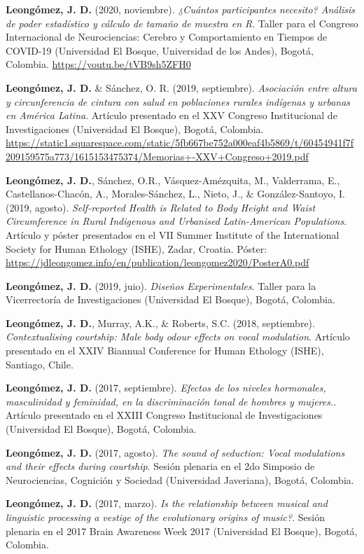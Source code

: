 \documentclass[11pt,a4paper,]{awesome-cv}
\begin{document}
\textbf{Leongómez, J. D.} (2020, noviembre). \emph{¿Cuántos
participantes necesito? Análisis de poder estadístico y cálculo de
tamaño de muestra en R}. Taller para el Congreso Internacional de
Neurociencias: Cerebro y Comportamiento en Tiempos de COVID-19
(Universidad El Bosque, Universidad de los Andes), Bogotá, Colombia.
\url{https://youtu.be/tVB9sh5ZFH0}

\textbf{Leongómez, J. D.} \& Sánchez, O. R. (2019, septiembre).
\emph{Asociación entre altura y circunferencia de cintura con salud en
poblaciones rurales indígenas y urbanas en América Latina}. Artículo
presentado en el XXV Congreso Institucional de Investigaciones
(Universidad El Bosque), Bogotá, Colombia.
\url{https://static1.squarespace.com/static/5fb667be752a000eaf4b5869/t/60454941f7f209159575a773/1615153475374/Memorias+-XXV+Congreso+2019.pdf}

\textbf{Leongómez, J. D.}, Sánchez, O.R., Vásquez-Amézquita, M.,
Valderrama, E., Castellanos-Chacón, A., Morales-Sánchez, L., Nieto, J.,
\& González-Santoyo, I. (2019, agosto). \emph{Self-reported Health is
Related to Body Height and Waist Circumference in Rural Indigenous and
Urbanised Latin-American Populations}. Artículo y póster presentados en
el VII Summer Institute of the International Society for Human Ethology
(ISHE), Zadar, Croatia. Póster:
\url{https://jdleongomez.info/en/publication/leongomez2020/PosterA0.pdf}

\textbf{Leongómez, J. D.} (2019, juio). \emph{Diseños Experimentales}.
Taller para la Vicerrectoría de Investigaciones (Universidad El Bosque),
Bogotá, Colombia.

\textbf{Leongómez, J. D.}, Murray, A.K., \& Roberts, S.C. (2018,
septiembre). \emph{Contextualising courtship: Male body odour effects on
vocal modulation}. Artículo presentado en el XXIV Biannual Conference
for Human Ethology (ISHE), Santiago, Chile.

\textbf{Leongómez, J. D.} (2017, septiembre). \emph{Efectos de los
niveles hormonales, masculinidad y feminidad, en la discriminación tonal
de hombres y mujeres.}. Artículo presentado en el XXIII Congreso
Institucional de Investigaciones (Universidad El Bosque), Bogotá,
Colombia.

\textbf{Leongómez, J. D.} (2017, agosto). \emph{The sound of seduction:
Vocal modulations and their effects during courtship}. Sesión plenaria
en el 2do Simposio de Neurociencias, Cognición y Sociedad (Universidad
Javeriana), Bogotá, Colombia.

\textbf{Leongómez, J. D.} (2017, marzo). \emph{Is the relationship
between musical and linguistic processing a vestige of the evolutionary
origins of music?}. Sesión plenaria en el 2017 Brain Awareness Week 2017
(Universidad El Bosque), Bogotá, Colombia.
\end{document}
